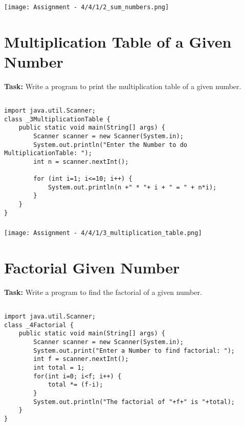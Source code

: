 \documentclass[12pt,a4paper]{article}
\begin{document}
\subsubsection{}
\begin{center}
    \texttt{[image: Assignment - 4/4/1/2\_sum\_numbers.png]}
\end{center}

\section{Multiplication Table of a Given Number}
\textbf{Task:} Write a program to print the multiplication table of a given number.

\subsection{}
\begin{lstlisting}
import java.util.Scanner;
class _3MultiplicationTable {
    public static void main(String[] args) {
        Scanner scanner = new Scanner(System.in);
        System.out.println("Enter the Number to do MultiplicationTable: ");
        int n = scanner.nextInt();
    
        for (int i=1; i<=10; i++) {
            System.out.println(n +" * "+ i + " = " + n*i);
        }
    }
}
\end{lstlisting}

\subsubsection{}
\begin{center}
    \texttt{[image: Assignment - 4/4/1/3\_multiplication\_table.png]}
\end{center}

\section{Factorial Given Number}
\textbf{Task:} Write a program to find the factorial of a given number.

\subsection{}
\begin{lstlisting}
import java.util.Scanner;
class _4Factorial {
    public static void main(String[] args) {
        Scanner scanner = new Scanner(System.in);
        System.out.print("Enter a Number to find factorial: ");
        int f = scanner.nextInt();
        int total = 1;
        for(int i=0; i<f; i++) {
            total *= (f-i);
        }
        System.out.println("The factorial of "+f+" is "+total);
    }
}
\end{lstlisting}
\end{document}
